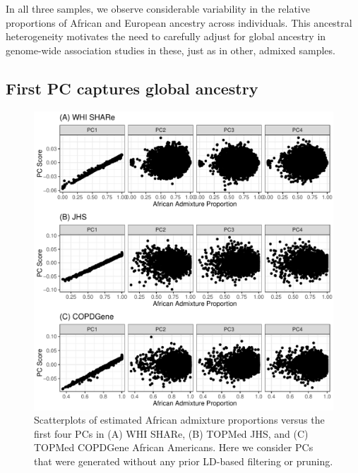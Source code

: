 \documentclass[12pt]{article}
\newcommand{\edit}[1]{{\color{red}{#1}}}
\begin{document}
In all three samples, we observe considerable variability in the relative proportions of African and European ancestry across individuals.
This ancestral heterogeneity motivates the need to carefully adjust for global ancestry in genome-wide association studies in these, just as in other, admixed samples. 



\subsection{First PC captures global ancestry}

\begin{figure}
\center
\includegraphics[width=\textwidth]{figs/pcs_vs_global/pcs_vs_global}
\caption{Scatterplots of estimated African admixture proportions versus the first four PCs in (A) WHI SHARe, (B) TOPMed JHS, and (C) TOPMed COPDGene African Americans. Here we consider PCs that were generated without any prior LD-based filtering or pruning.}
\label{fig:pcsvsglob}
\end{figure}
\end{document}
